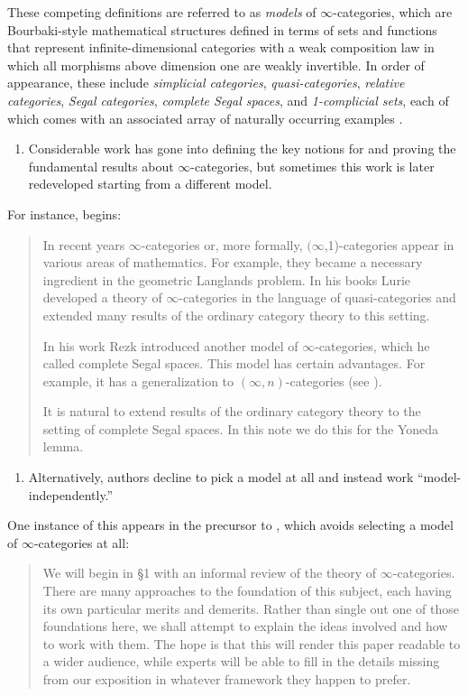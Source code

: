 \documentclass[11pt]{ctexart}
\theoremstyle{definition}
\theoremstyle{remark}
\numberwithin{equation}{section}
\newcommand{\1}{\mathbbe{1}}
\newcommand{\2}{\mathbbe{2}}
\newcommand{\3}{\mathbbe{3}}
\begin{document}
 These competing definitions are referred to as \emph{models} of $\infty$-categories, which  are Bourbaki-style mathematical structures defined in terms of sets and functions that represent infinite-dimensional categories with a weak composition law in which all morphisms above dimension one are weakly invertible.  In order of appearance, these include \emph{simplicial categories}, \emph{quasi-categories}, \emph{relative categories}, \emph{Segal categories}, \emph{complete Segal spaces}, and \emph{1-com\-pli\-cial sets}, each of which comes with an associated array of naturally occurring examples \cite{AntolinCamarena:2013aw, Bergner:2018ht}. 
 \begin{enumerate}[resume]
\item Considerable work has gone into defining the key notions for and proving the fundamental results about $\infty$-categories, but sometimes this work is  later redeveloped starting from a different model.
\end{enumerate}
For instance, \cite{KV} begins:
\begin{quote}
In recent years $\infty$-categories or, more formally, $(\infty$,1)-categories appear in various areas of mathematics. For example, they became a necessary ingredient in the geometric Langlands problem. In his books \cite{lurie-topos,lurie-algebra} Lurie developed a theory of $\infty$-cat\-e\-gor\-ies in the language of quasi-categories and extended many results of the ordinary category theory to this setting. 

In his work \cite{rezk-CSS} Rezk introduced another model of $\infty$-cat\-e\-gor\-ies, which he called complete Segal spaces. This model has certain advantages. For example, it has a generalization to $(\infty,n)$-categories (see \cite{rezk-cartesian}).

 It is natural to extend results of the ordinary category theory to the setting of complete Segal spaces. In this note we do this for the Yoneda lemma.\end{quote}
\begin{enumerate}[resume]
\item Alternatively, authors decline to pick a model at all and instead work ``model-in\-de\-pen\-dent\-ly.''
\end{enumerate}
One instance of this appears in the precursor \cite{lurie-on-topoi} to \cite{lurie-topos}, which avoids selecting a model of $\infty$-categories at all:
\begin{quote}
We will begin in \S 1 with an informal review of the theory of $\infty$-categories. There are many approaches to the foundation of this subject, each having its own particular merits and demerits. Rather than single out one of those foundations here, we shall attempt to explain the ideas involved and how to work with them. The hope is that this will render this paper readable to a wider audience, while experts will be able to fill in the details missing from our exposition in whatever framework they happen to prefer.
\end{quote}
\end{document}
